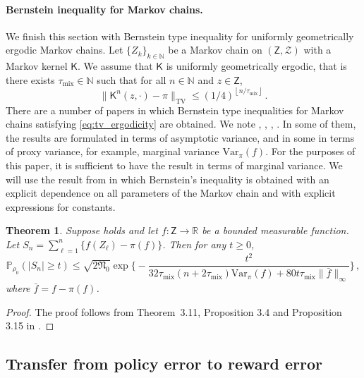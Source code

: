 \documentclass{article}
\newtheorem{theorem}[proposition]{Theorem}
\theoremstyle{definition}
\theoremstyle{remark}
\theoremstyle{plain}
\newcommand{\Var}{\mathrm{Var}}
\def\Zset{\mathsf{Z}}
\def\Zsigma{\mathcal{Z}}
\def\nset{\mathbb{N}}
\newcommand{\tmix}{\tau_{\mathrm{mix}}}
\def\eqsp{\,}
\newcommand{\tvnorm}[1]{\| #1 \|_{\operatorname{TV}}}
\def\rset{\mathbb{R}}
\newcommand{\barf}{\bar{f}}
\newcommand{\PP}{\mathbb{P}}
\numberwithin{equation}{section}
\begin{document}
\paragraph{Bernstein inequality for Markov chains.} We finish this section with Bernstein type inequality for uniformly geometrically ergodic Markov chains. 
Let $\{Z_k\}_{k \in \nset}$ be a Markov chain on $(\Zset,\Zsigma)$ with a Markov kernel $\mathsf K$. We assume that $\mathsf K$ is uniformly geometrically ergodic, that is there exists $\tmix \in \nset$ such that for all $n \in \nset$ and $z \in \Zset$,
\begin{equation}
\label{eq:tv_ergodicity}
\tvnorm{\mathsf K^{n}(z, \cdot) - \pi} \leq (1/4)^{\left\lfloor n/\tmix \right\rfloor}\eqsp.
\end{equation}
There are a number of papers in which Bernstein type inequalities for Markov chains satisfying \eqref{eq:tv_ergodicity} are obtained. We note  \cite{rio2017asymptotic}, \cite{durmus2024probability}, \cite{durmus2023rosenthal}, \cite{paulin2015concentration}. In some of them, the results are formulated in terms of asymptotic variance, and in some in terms of proxy variance, for example, marginal variance $\Var_\pi(f)$. For the purposes of this paper, it is sufficient to have the result in terms of marginal variance.  We will use the result from \cite{paulin2015concentration} in which Bernstein's inequality is obtained with an explicit dependence on all parameters of the Markov chain and with explicit expressions for constants.
\begin{theorem}
\label{th:bernstein_inequality}
Suppose  holds and let $f: \Zset \to \rset$ be a bounded measurable function. Let $S_n = \sum_{\ell=1}^n \{f(Z_\ell) - \pi(f)\}$. Then for any $t \geq 0$, 
\begin{equation}
\label{eq:bernstein_inequality}
\PP_{\rho_0}(|S_n| \geq t) \leq \sqrt{2\mathfrak N_0} \exp\biggl\{-\frac{t^2}{32\tmix(n + 2\tmix)\Var_{\pi}(f) + 80 t \tmix \|\barf\|_{\infty}}\biggr\}\eqsp, 
\end{equation}
where $\bar f = f - \pi(f)$. 
\end{theorem}
\begin{proof}
    The proof follows from Theorem~3.11,  Proposition 3.4 and Proposition 3.15 in \cite{paulin2015concentration}. 
\end{proof}

\subsection{Transfer from policy error to reward error}
\label{subsec:proof-reward-stability}
\end{document}
